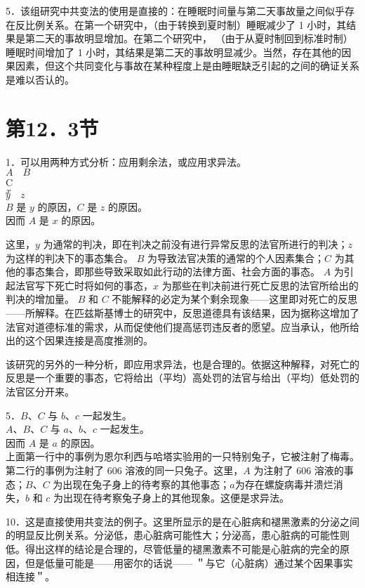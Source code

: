 5．该组研究中共变法的使用是直接的：在睡眠时间量与第二天事故量之间似乎存在反比例关系。在第一个研究中，（由于转换到夏时制）睡眠减少了 1 小时，其结果是第二天的事故明显增加。在第二个研究中， （由于从夏时制回到标准时制）睡眠时间增加了 1 小时，其结果是第二天的事故明显减少。当然，存在其他的因果因素，但这个共同变化与事故在某种程度上是由睡眠缺乏引起的之间的确证关系是难以否认的。

\section*{第12．3节}
1．可以用两种方式分析：应用剩余法，或应用求异法。\\
$A \quad B$\\
C\\
$x$\\
$y \quad z$\\
$B$ 是 $y$ 的原因，$C$ 是 $z$ 的原因。\\
因而 $A$ 是 $x$ 的原因。

这里，$y$ 为通常的判决，即在判决之前没有进行异常反思的法官所进行的判决；$z$ 为这样的判决下的事态集合。 $B$ 为导致法官决策的通常的个人因素集合；$C$ 为其他的事态集合，即那些导致采取如此行动的法律方面、社会方面的事态。 $A$ 为引起法官写下死亡时将如何的事态，$x$ 为那些在判决前进行死亡反思的法官所给出的判决的增加量。 $B$ 和 $C$ 不能解释的必定为某个剩余现象——这里即对死亡的反思——所解释。在匹兹斯基博士的研究中，反思道德具有该结果，因为据称这增加了法官对道德标准的需求，从而促使他们提高惩罚违反者的愿望。应当承认，他所给出的这个因果连接是高度推测的。

该研究的另外的一种分析，即应用求异法，也是合理的。依据这种解释，对死亡的反思是一个重要的事态，它将给出（平均）高处罚的法官与给出（平均）低处罚的法官区分开来。

5．$B 、 C$ 与 $b 、 c$ 一起发生。\\
$A 、 B 、 C$ 与 $a 、 b 、 c$ 一起发生。\\
因而 $A$ 是 $a$ 的原因。\\
上面第一行中的事例为恩尔利西与哈塔实验用的一只特别兔子，它被注射了梅毒。第二行的事例为注射了 606 溶液的同一只兔子。这里，$A$ 为注射了 606 溶液的事态；$B 、 C$ 为出现在兔子身上的待考察的其他事态；$a$为存在螺旋病毒并溃烂消失，$b$ 和 $c$ 为出现在待考察兔子身上的其他现象。这便是求异法。

10．这是直接使用共变法的例子。这里所显示的是在心脏病和褪黑激素的分泌之间的明显反比例关系。分泌低，患心脏病可能性大；分泌高，患心脏病的可能性则低。得出这样的结论是合理的，尽管低量的褪黑激素不可能是心脏病的完全的原因，但是低量可能是——用密尔的话说—— ＂与它（心脏病）通过某个因果事实相连接＂。

